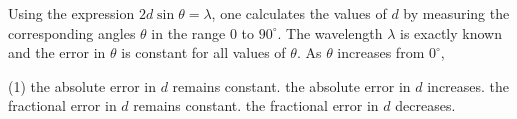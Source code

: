 
\item Using the expression \(2d \sin \theta = \lambda\), one calculates the values of \(d\) by measuring the corresponding angles \(\theta\) in the range \(0\) to \(90^\circ\). The wavelength \(\lambda\) is exactly known and the error in \(\theta\) is constant for all values of \(\theta\). As \(\theta\) increases from \(0^\circ\),
    \begin{tasks}(1)
        \task the absolute error in \(d\) remains constant.
        \task the absolute error in \(d\) increases.
        \task the fractional error in \(d\) remains constant.
        \task the fractional error in \(d\) decreases.
    \end{tasks}
